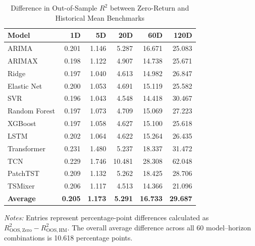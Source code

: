 \documentclass[12pt,twoside]{ord}
\begin{document}
\begin{table}[htbp]
\centering
\caption{Difference in Out-of-Sample $R^2$ between Zero-Return and Historical Mean Benchmarks}
\label{tab:benchmark_difference}
\small
\setlength{\tabcolsep}{6pt}
\renewcommand{\arraystretch}{1.12}
\begin{tabular}{lrrrrr}
\hline
\textbf{Model} & \textbf{1D} & \textbf{5D} & \textbf{20D} & \textbf{60D} & \textbf{120D} \\
\hline
ARIMA          & 0.201 & 1.146 &  5.287 & 16.671 & 25.083 \\
ARIMAX         & 0.198 & 1.122 &  4.907 & 14.738 & 25.671 \\
Ridge          & 0.197 & 1.040 &  4.613 & 14.982 & 26.847 \\
Elastic Net    & 0.200 & 1.053 &  4.691 & 15.119 & 25.582 \\
SVR            & 0.196 & 1.043 &  4.548 & 14.418 & 30.467 \\
Random Forest  & 0.197 & 1.073 &  4.709 & 15.069 & 27.223 \\
XGBoost        & 0.197 & 1.058 &  4.627 & 15.100 & 25.618 \\
LSTM           & 0.202 & 1.064 &  4.622 & 15.264 & 26.435 \\
Transformer    & 0.231 & 1.480 &  5.237 & 18.337 & 31.472 \\
TCN            & 0.229 & 1.746 & 10.481 & 28.308 & 62.048 \\
PatchTST       & 0.209 & 1.132 &  5.262 & 18.425 & 28.706 \\
TSMixer        & 0.206 & 1.117 &  4.513 & 14.366 & 21.096 \\
\hline
\textbf{Average} & \textbf{0.205} & \textbf{1.173} & \textbf{5.291} & \textbf{16.733} & \textbf{29.687} \\
\hline
\end{tabular}
\par\vspace{4pt}\parbox{\linewidth}{\fontsize{9pt}{12pt}\selectfont\textit{Notes:} Entries represent percentage-point differences calculated as $R^2_{\mathrm{OOS,Zero}}-R^2_{\mathrm{OOS,HM}}$. The overall average difference across all 60 model--horizon combinations is 10.618 percentage points.}
\end{table}
\end{document}
